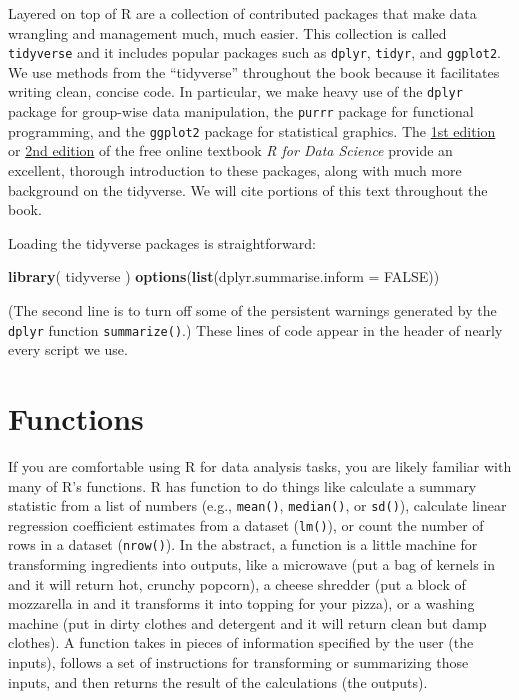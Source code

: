 \documentclass[
]{book}
\newenvironment{Shaded}{\begin{snugshade}}{\end{snugshade}}
\newcommand{\AttributeTok}[1]{\textcolor[rgb]{0.13,0.29,0.53}{#1}}
\newcommand{\ConstantTok}[1]{\textcolor[rgb]{0.56,0.35,0.01}{#1}}
\newcommand{\FunctionTok}[1]{\textcolor[rgb]{0.13,0.29,0.53}{\textbf{#1}}}
\newcommand{\NormalTok}[1]{#1}
\begin{document}
Layered on top of R are a collection of contributed packages that make data wrangling and management much, much easier.
This collection is called \texttt{tidyverse} and it includes popular packages such as \texttt{dplyr}, \texttt{tidyr}, and \texttt{ggplot2}.
We use methods from the ``tidyverse'' throughout the book because it facilitates writing clean, concise code.
In particular, we make heavy use of the \texttt{dplyr} package for group-wise data manipulation, the \texttt{purrr} package for functional programming, and the \texttt{ggplot2} package for statistical graphics.
The \href{https://r4ds.had.co.nz/}{1st edition} or \href{https://r4ds.hadley.nz/}{2nd edition} of the free online textbook \emph{R for Data Science} provide an excellent, thorough introduction to these packages, along with much more background on the tidyverse.
We will cite portions of this text throughout the book.

Loading the tidyverse packages is straightforward:

\begin{Shaded}
\begin{Highlighting}[]
\FunctionTok{library}\NormalTok{( tidyverse )}
\FunctionTok{options}\NormalTok{(}\FunctionTok{list}\NormalTok{(}\AttributeTok{dplyr.summarise.inform =} \ConstantTok{FALSE}\NormalTok{))}
\end{Highlighting}
\end{Shaded}

(The second line is to turn off some of the persistent warnings generated by the \texttt{dplyr} function \texttt{summarize()}.)
These lines of code appear in the header of nearly every script we use.

\section{Functions}\label{functions}

If you are comfortable using R for data analysis tasks, you are likely familiar with many of R's functions.
R has function to do things like calculate a summary statistic from a list of numbers (e.g., \texttt{mean()}, \texttt{median()}, or \texttt{sd()}), calculate linear regression coefficient estimates from a dataset (\texttt{lm()}), or count the number of rows in a dataset (\texttt{nrow()}).
In the abstract, a function is a little machine for transforming ingredients into outputs, like a microwave (put a bag of kernels in and it will return hot, crunchy popcorn), a cheese shredder (put a block of mozzarella in and it transforms it into topping for your pizza), or a washing machine (put in dirty clothes and detergent and it will return clean but damp clothes).
A function takes in pieces of information specified by the user (the inputs), follows a set of instructions for transforming or summarizing those inputs, and then returns the result of the calculations (the outputs).
\end{document}
